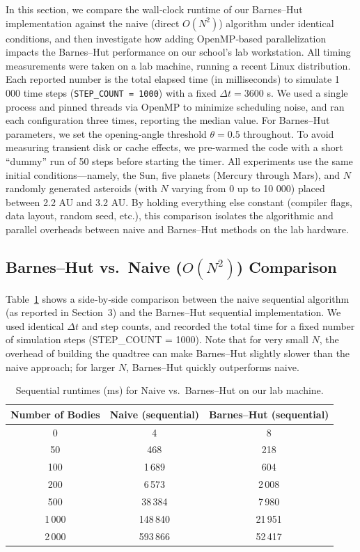 \documentclass{article}
\begin{document}
\noindent
In this section, we compare the wall‐clock runtime of our Barnes–Hut implementation against the naive (direct \(O(N^2)\)) algorithm under identical conditions, and then investigate how adding OpenMP‐based parallelization impacts the Barnes–Hut performance on our school’s lab workstation. All timing measurements were taken on a lab machine, running a recent Linux distribution. Each reported number is the total elapsed time (in milliseconds) to simulate 1 000 time steps (\texttt{STEP\_COUNT = 1000}) with a fixed \(\Delta t = 3600\) s. We used a single process and pinned threads via OpenMP to minimize scheduling noise, and ran each configuration three times, reporting the median value. For Barnes–Hut parameters, we set the opening‐angle threshold \(\theta = 0.5\) throughout. To avoid measuring transient disk or cache effects, we pre‐warmed the code with a short “dummy” run of 50 steps before starting the timer. All experiments use the same initial conditions—namely, the Sun, five planets (Mercury through Mars), and \(N\) randomly generated asteroids (with \(N\) varying from 0 up to 10 000) placed between 2.2 AU and 3.2 AU. By holding everything else constant (compiler flags, data layout, random seed, etc.), this comparison isolates the algorithmic and parallel overheads between naive and Barnes–Hut methods on the lab hardware.


\subsection{Barnes–Hut vs.\ Naive ($O(N^2)$) Comparison}

Table~\ref{tab:naive_vs_bh} shows a side‐by‐side comparison between the naive sequential algorithm (as reported in Section~3) and the Barnes–Hut sequential implementation.  We used identical $\Delta t$ and step counts, and recorded the total time for a fixed number of simulation steps (STEP\_COUNT = 1000).  Note that for very small $N$, the overhead of building the quadtree can make Barnes–Hut slightly slower than the naive approach; for larger $N$, Barnes–Hut quickly outperforms naive.

\begin{table}[H]
    \centering
    \begin{tabular}{|c|c|c|}
    \hline
    \textbf{Number of Bodies} & \textbf{Naive (sequential)} & \textbf{Barnes–Hut (sequential)} \\
    \hline
    0     &     4    &      8    \\ 
    50    &   468    &    218    \\ 
    100   &  1\,689  &    604    \\ 
    200   &  6\,573  &  2\,008   \\ 
    500   & 38\,384  &  7\,980   \\ 
    1\,000 & 148\,840 & 21\,951   \\ 
    2\,000 & 593\,866 & 52\,417   \\ 
    \hline
    \end{tabular}
    \caption{Sequential runtimes (ms) for Naive vs.\ Barnes–Hut on our lab machine.}
    \label{tab:naive_vs_bh}
\end{table}
\end{document}
